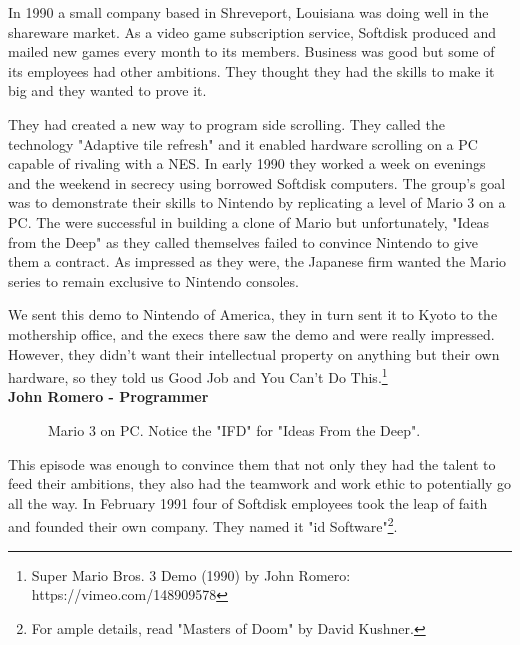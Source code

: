 \documentclass[book.tex]{subfiles}
\begin{document}
In 1990 a small company based in Shreveport, Louisiana was doing well in the shareware market. As a video game subscription service, Softdisk produced and mailed new games every month to its members. Business was good but some of its employees had other ambitions. They thought they had the skills to make it big and they wanted to prove it.\\
\par
They had created a new way to program side scrolling. They called the technology "Adaptive tile refresh" and it enabled hardware scrolling on a PC capable of rivaling with a NES. In early 1990 they worked a week on evenings and the weekend in secrecy using borrowed Softdisk computers. The group's goal was to demonstrate their skills to Nintendo by replicating a level of Mario 3 on a PC. The were successful in building a clone of Mario  but unfortunately, "Ideas from the Deep" as they called themselves failed to convince Nintendo to give them a contract. As impressed as they were, the Japanese firm wanted the Mario series to remain exclusive to Nintendo consoles.\\
\par
\begin{fancyquotes}
We sent this demo to Nintendo of America, they in turn sent it to Kyoto to the mothership office, and the execs there saw the demo and were really impressed. However, they didn't want their intellectual property on anything but their own hardware, so they told us Good Job and You Can't Do This.\footnote{Super Mario Bros. 3 Demo (1990) by John Romero: https://vimeo.com/148909578}
 \bigskip \\
\textbf{John Romero - Programmer}
 \end{fancyquotes}

 \begin{figure}[H]
\caption{Mario 3 on PC. Notice the "IFD" for "Ideas From the Deep".}
\end{figure}

\par
This episode was enough to convince them that not only they had the talent to feed their ambitions, they also had the teamwork and work ethic to potentially go all the way. In February 1991 four of Softdisk employees took the leap of faith and founded their own company. They named it "id Software"\footnote{For ample details, read "Masters of Doom" by David Kushner.}. 
\end{document}
